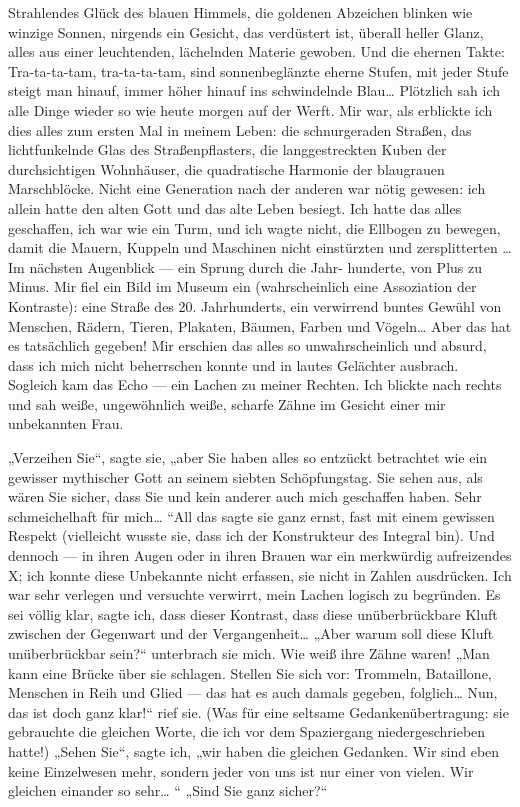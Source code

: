 Strahlendes Glück des blauen Himmels, die goldenen Abzeichen
blinken wie winzige Sonnen, nirgends ein Gesicht, das verdüstert
ist, überall heller Glanz, alles aus einer leuchtenden, lächelnden
Materie gewoben. Und die ehernen Takte: Tra-ta-ta-tam,
tra-ta-ta-tam, sind sonnenbeglänzte eherne Stufen, mit jeder Stufe
steigt man hinauf, immer höher hinauf ins schwindelnde Blau\ldots{}
Plötzlich sah ich alle Dinge wieder so wie heute morgen auf der
Werft. Mir war, als erblickte ich dies alles zum ersten Mal in
meinem Leben: die schnurgeraden Straßen, das lichtfunkelnde Glas
des Straßenpflasters, die langgestreckten Kuben der durchsichtigen
Wohnhäuser, die quadratische Harmonie der blaugrauen Marschblöcke.
Nicht eine Generation nach der anderen war nötig gewesen: ich
allein hatte den alten Gott und das alte Leben besiegt. Ich hatte
das alles geschaffen, ich war wie ein Turm, und ich wagte nicht,
die Ellbogen zu bewegen, damit die Mauern, Kuppeln und Maschinen
nicht einstürzten und zersplitterten \ldots{} Im nächsten Augenblick —
ein Sprung durch die Jahr-
hunderte, von Plus zu Minus. Mir fiel ein Bild im Museum ein
(wahrscheinlich eine Assoziation der Kontraste): eine Straße des
20. Jahrhunderts, ein verwirrend buntes Gewühl von Menschen,
Rädern, Tieren, Plakaten, Bäumen, Farben und Vögeln\ldots{} Aber das hat
es tatsächlich gegeben! Mir erschien das alles so unwahrscheinlich
und absurd, dass ich mich nicht beherrschen konnte und in lautes
Gelächter ausbrach. Sogleich kam das Echo — ein Lachen zu meiner
Rechten. Ich blickte nach rechts und sah weiße, ungewöhnlich weiße,
scharfe Zähne im Gesicht einer mir unbekannten Frau.

„Verzeihen Sie“, sagte sie, „aber Sie haben alles so entzückt
betrachtet wie ein gewisser mythischer Gott an seinem siebten
Schöpfungstag. Sie sehen aus, als wären Sie sicher, dass Sie und
kein anderer auch mich geschaffen haben. Sehr schmeichelhaft für
mich\ldots{} “All das sagte sie ganz ernst, fast mit einem gewissen
Respekt (vielleicht wusste sie, dass ich der Konstrukteur des
Integral bin). Und dennoch — in ihren Augen oder in ihren Brauen
war ein merkwürdig aufreizendes X; ich konnte diese Unbekannte
nicht erfassen, sie nicht in Zahlen ausdrücken. Ich war sehr
verlegen und versuchte verwirrt, mein Lachen logisch zu begründen.
Es sei völlig klar, sagte ich, dass dieser Kontrast, dass diese
unüberbrückbare Kluft zwischen der Gegenwart und der
Vergangenheit\ldots{} „Aber warum soll diese Kluft unüberbrückbar sein?“
unterbrach sie mich. Wie weiß ihre Zähne waren! „Man kann eine
Brücke über sie schlagen. Stellen Sie sich vor: Trommeln,
Bataillone, Menschen in Reih und Glied — das hat es auch damals
gegeben, folglich\ldots{} Nun, das ist doch ganz klar!“ rief sie. (Was
für eine seltsame Gedankenübertragung: sie gebrauchte die gleichen
Worte, die ich vor dem Spaziergang niedergeschrieben
hatte!) „Sehen Sie“, sagte ich, „wir haben die gleichen Gedanken.
Wir sind eben keine Einzelwesen mehr, sondern jeder von uns ist nur
einer von vielen. Wir gleichen einander so sehr\ldots{} “ „Sind Sie ganz
sicher?“

